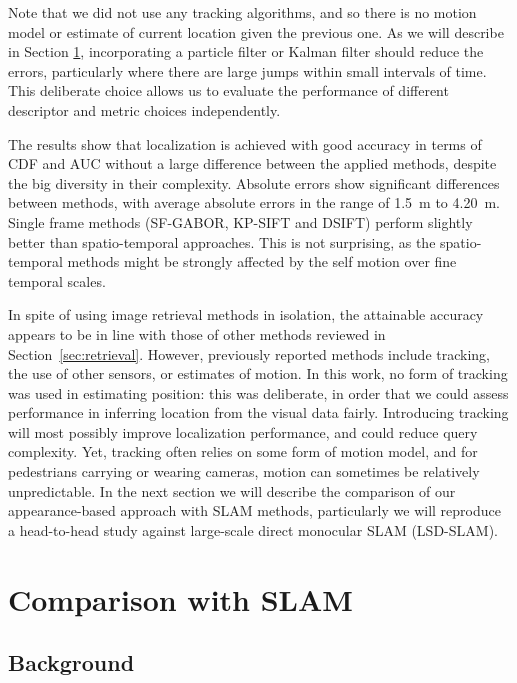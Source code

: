 Note that we did not use any tracking algorithms, and so there is no motion model or estimate of current location given the previous one. As we will describe in Section \ref{sec:slamcomp}, incorporating a particle filter or Kalman filter should reduce the errors, particularly where there are large jumps within small intervals of time. This deliberate choice allows us to evaluate the performance of different descriptor and metric choices independently.

The results show that localization is achieved with good accuracy in terms of CDF and AUC without a large difference between the applied methods, despite the big diversity in their complexity. Absolute errors show significant differences between methods, with average absolute errors in the range of \SI{1.5}{m} to \SI{4.20}{m}. Single frame methods (SF-GABOR, KP-SIFT and DSIFT) perform slightly better than spatio-temporal approaches. This is not surprising, as the spatio-temporal methods might be strongly affected by the self motion over fine temporal scales.

In spite of using image retrieval methods in isolation, the attainable accuracy appears to be in line with those of  other methods reviewed in Section~\ref{sec:retrieval}.  However, previously reported methods include tracking, the use of other sensors, or estimates of motion. In this work, no form of tracking was used in estimating position: this was deliberate, in order that we could assess performance in inferring location from the visual data fairly.  Introducing tracking will most possibly improve localization performance, and could reduce query complexity. Yet, tracking often relies on some form of motion model, and for pedestrians carrying or wearing cameras, motion can sometimes be relatively unpredictable. In the next section we will describe the comparison  of our appearance-based approach with SLAM methods, particularly we will reproduce a head-to-head study against large-scale direct monocular SLAM (LSD-SLAM).

\section{Comparison with SLAM}
\label{sec:slamcomp}


\subsection{Background}



